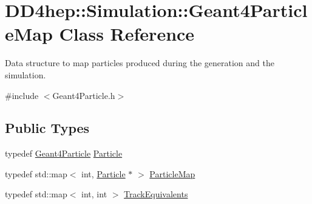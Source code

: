 \hypertarget{class_d_d4hep_1_1_simulation_1_1_geant4_particle_map}{}\section{D\+D4hep\+:\+:Simulation\+:\+:Geant4\+Particle\+Map Class Reference}
\label{class_d_d4hep_1_1_simulation_1_1_geant4_particle_map}


Data structure to map particles produced during the generation and the simulation.  




{\ttfamily \#include $<$Geant4\+Particle.\+h$>$}

\subsection*{Public Types}
\begin{DoxyCompactItemize}
\item 
typedef \hyperlink{class_d_d4hep_1_1_simulation_1_1_geant4_particle}{Geant4\+Particle} \hyperlink{class_d_d4hep_1_1_simulation_1_1_geant4_particle_map_a01ed68f2fc2e55ecf936e5ac3e6eae5f}{Particle}
\item 
typedef std\+::map$<$ int, \hyperlink{class_d_d4hep_1_1_simulation_1_1_geant4_particle_map_a01ed68f2fc2e55ecf936e5ac3e6eae5f}{Particle} $\ast$ $>$ \hyperlink{class_d_d4hep_1_1_simulation_1_1_geant4_particle_map_a065c5fb0629285022b9aa2a628bffef3}{Particle\+Map}
\item 
typedef std\+::map$<$ int, int $>$ \hyperlink{class_d_d4hep_1_1_simulation_1_1_geant4_particle_map_aba09f5fcb2dd5874d129660ad4454a21}{Track\+Equivalents}
\end{DoxyCompactItemize}
